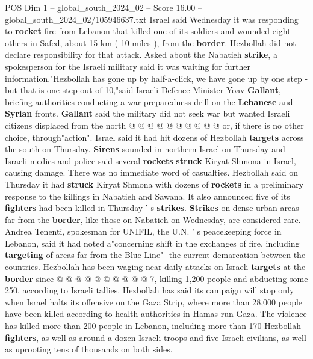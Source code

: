\begin{textsample}{POS Dim 1 – global\_south\_2024\_02 – Score 16.00 – global\_south\_2024\_02/105946637.txt}
Israel said Wednesday it was responding to \textbf{rocket} fire from Lebanon that killed one of its soldiers and wounded eight others in Safed, about 15 km ( 10 miles ), from the \textbf{border}.
Hezbollah did not declare responsibility for that attack.
Asked about the Nabatieh \textbf{strike}, a spokesperson for the Israeli military said it was waiting for further information."Hezbollah has gone up by half-a-click, we have gone up by one step - but that is one step out of 10,"said Israeli Defence Minister Yoav \textbf{Gallant}, briefing authorities conducting a war-preparedness drill on the \textbf{Lebanese} and \textbf{Syrian} fronts. \textbf{Gallant} said the military did not seek war but wanted Israeli citizens displaced from the north @ @ @ @ @ @ @ @ @ @ or, if there is no other choice, through"action".
Israel said it had hit dozens of Hezbollah \textbf{targets} across the south on Thursday. \textbf{Sirens} sounded in northern Israel on Thursday and Israeli medics and police said several \textbf{rockets} \textbf{struck} Kiryat Shmona in Israel, causing damage.
There was no immediate word of casualties.
Hezbollah said on Thursday it had \textbf{struck} Kiryat Shmona with dozens of \textbf{rockets} in a preliminary response to the killings in Nabatieh and Sawana.
It also announced five of its \textbf{fighters} had been killed in Thursday ' s \textbf{strikes}. \textbf{Strikes} on dense urban areas far from the \textbf{border}, like those on Nabatieh on Wednesday, are considered rare.
Andrea Tenenti, spokesman for UNIFIL, the U.N. ' s peacekeeping force in Lebanon, said it had noted a"concerning shift in the exchanges of fire, including \textbf{targeting} of areas far from the Blue Line"- the current demarcation between the countries.
Hezbollah has been waging near daily attacks on Israeli \textbf{targets} at the \textbf{border} since @ @ @ @ @ @ @ @ @ @ 7, killing 1,200 people and abducting some 250, according to Israeli tallies.
Hezbollah has said its campaign will stop only when Israel halts its offensive on the Gaza Strip, where more than 28,000 people have been killed according to health authorities in Hamas-run Gaza.
The violence has killed more than 200 people in Lebanon, including more than 170 Hezbollah \textbf{fighters}, as well as around a dozen Israeli troops and five Israeli civilians, as well as uprooting tens of thousands on both sides.

\end{textsample}
